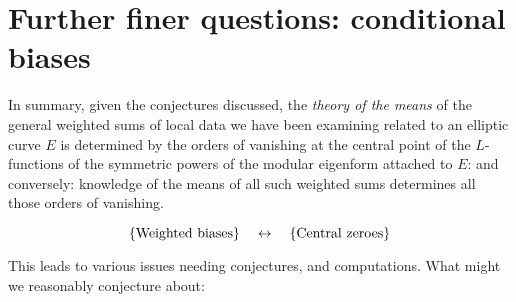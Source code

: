 \documentclass[11pt]{article}
\theoremstyle{plain}
\theoremstyle{definition}
\numberwithin{equation}{section}
\numberwithin{figure}{section}
\numberwithin{table}{section}
\begin{document}
\vskip10pt
\section{Further finer questions: conditional biases}
\vskip10pt

 In summary, given the conjectures discussed, the {\it theory of the means} of the general weighted sums of local data we have been examining related to an elliptic curve $E$ is determined by the orders of vanishing at the central point of the $L$-functions of the symmetric powers of the modular eigenform attached to $E$: and conversely: knowledge of the means of all such weighted sums determines all those orders of vanishing.


 \vskip20pt $$\{{\rm Weighted\ biases}\} \ \ \ \leftrightarrow\ \ \  \{{\rm Central\ zeroes}\}$$


This leads to  various issues needing conjectures, and computations. What might we reasonably conjecture about:
\end{document}
